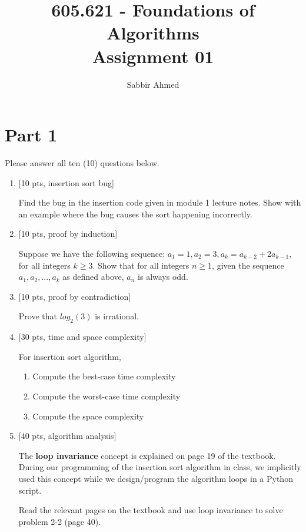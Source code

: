 \documentclass[12pt]{article}
\begin{document}
  \title{605.621 - Foundations of Algorithms \\ Assignment 01\vspace{-0.5em}}
  \author{Sabbir Ahmed}
  \maketitle
  \vspace{-1em}

  \section*{Part 1} Please answer all ten (10) questions below.

  \begin{enumerate}

    \item {[10 pts, insertion sort bug]}

    Find the bug in the insertion code given in module 1 lecture notes. Show with an example where the bug causes the sort happening incorrectly.

    \item {[10 pts, proof by induction]}

    Suppose we have the following sequence: $a_1=1, a_2=3, a_k=a_{k-2} + 2a_{k-1}$, for all integers $k\ge3$. Show that for all integers $n\ge1$, given the sequence $a_1, a_2, ..., a_k$ as defined above, $a_n$ is always odd.

    \item {[10 pts, proof by contradiction]}

    Prove that $log_2(3)$ is irrational.

    \item {[30 pts, time and space complexity]}
    
    For insertion sort algorithm,
    \begin{enumerate}
      \item Compute the best-case time complexity
      \item Compute the worst-case time complexity
      \item Compute the space complexity
    \end{enumerate}

    \item {[40 pts, algorithm analysis]}

    The \textbf{loop invariance} concept is explained on page 19 of the textbook. During our programming of the insertion sort algorithm in class, we implicitly used this concept while we design/program the algorithm loops in a Python script.

    Read the relevant pages on the textbook and use loop invariance to solve problem 2-2 (page 40).

  \end{enumerate}
\end{document}
